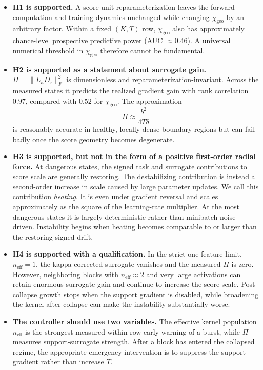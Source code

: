 \documentclass[11pt,a4paper]{article}
\newcommand{\neff}{n_{\mathrm{eff}}}
\newcommand{\chigeo}{\chi_{\mathrm{geo}}}
\newcommand{\Pisurr}{\Pi}
\begin{document}
\begin{itemize}[leftmargin=1.4em]
\item \textbf{H1 is supported.} A score-unit reparameterization leaves the forward computation and training dynamics unchanged while changing \(\chigeo\) by an arbitrary factor. Within a fixed \((K,T)\) row, \(\chigeo\) also has approximately chance-level prospective predictive power (AUC \(\approx0.46\)). A universal numerical threshold in \(\chigeo\) therefore cannot be fundamental.

\item \textbf{H2 is supported as a statement about surrogate gain.} \(\Pisurr=\|L_\kappa D_z\|_F^2\) is dimensionless and reparameterization-invariant. Across the measured states it predicts the realized gradient gain with rank correlation \(0.97\), compared with \(0.52\) for \(\chigeo\). The approximation
\[
\Pisurr\approx\frac{b^2}{4T\delta}
\]
is reasonably accurate in healthy, locally dense boundary regions but can fail badly once the score geometry becomes degenerate.

\item \textbf{H3 is supported, but not in the form of a positive first-order radial force.} At dangerous states, the signed task and surrogate contributions to score scale are generally restoring. The destabilizing contribution is instead a second-order increase in scale caused by large parameter updates. We call this contribution \emph{heating}. It is even under gradient reversal and scales approximately as the square of the learning-rate multiplier. At the most dangerous states it is largely deterministic rather than minibatch-noise driven. Instability begins when heating becomes comparable to or larger than the restoring signed drift.

\item \textbf{H4 is supported with a qualification.} In the strict one-feature limit, \(\neff=1\), the kappa-corrected surrogate vanishes and the measured \(\Pisurr\) is zero. However, neighboring blocks with \(\neff\approx2\) and very large activations can retain enormous surrogate gain and continue to increase the score scale. Post-collapse growth stops when the support gradient is disabled, while broadening the kernel after collapse can make the instability substantially worse.

\item \textbf{The controller should use two variables.} The effective kernel population \(\neff\) is the strongest measured within-row early warning of a burst, while \(\Pisurr\) measures support-surrogate strength. After a block has entered the collapsed regime, the appropriate emergency intervention is to suppress the support gradient rather than increase \(T\).
\end{itemize}
\end{document}
